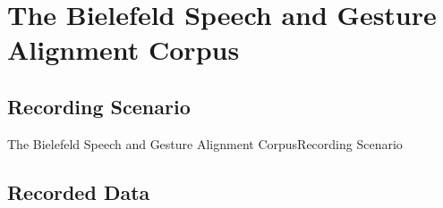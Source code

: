 \documentclass{beamer}
\begin{document}
	\section{The Bielefeld Speech and Gesture Alignment Corpus}
		\subsection{Recording Scenario}
			\begin{frame}{The Bielefeld Speech and Gesture Alignment Corpus}{Recording Scenario}
				\begin{figure}
				\end{figure}
			\end{frame}
		
		\subsection{Recorded Data}
			
\end{document}
